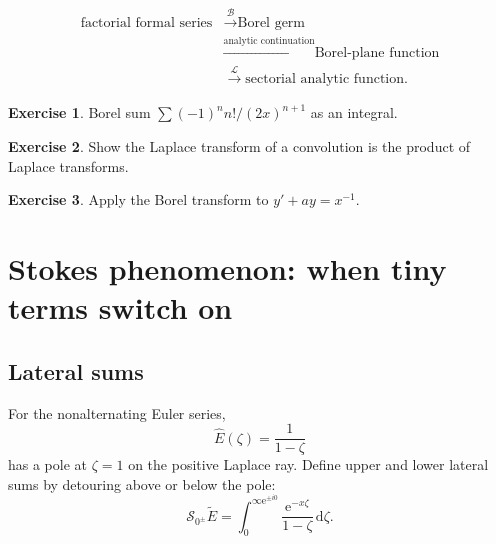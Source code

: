 \documentclass[11pt,oneside,openany]{book}
\newcommand{\e}{\mathrm{e}}
\newcommand{\dd}{\,\mathrm{d}}
\newcommand{\Borel}{\mathcal{B}}
\newcommand{\Laplace}{\mathcal{L}}
\theoremstyle{plain}
\theoremstyle{definition}
\newtheorem{exercise}{Exercise}[chapter]
\theoremstyle{remark}
\begin{document}
\begin{checkpoint}
\[
\begin{aligned}
  \text{factorial formal series}
  &\xrightarrow{\Borel}\text{Borel germ}\\
  &\xrightarrow{\text{analytic continuation}}\text{Borel-plane function}\\
  &\xrightarrow{\Laplace}\text{sectorial analytic function}.
\end{aligned}
\]
\end{checkpoint}

\begin{exercise}
Borel sum $\sum(-1)^nn!/(2x)^{n+1}$ as an integral.
\end{exercise}

\begin{exercise}
Show the Laplace transform of a convolution is the product of Laplace transforms.
\end{exercise}

\begin{exercise}
Apply the Borel transform to $y'+ay=x^{-1}$.
\end{exercise}


\chapter{Stokes phenomenon: when tiny terms switch on}
\label{ch:stokes}

\section{Lateral sums}
For the nonalternating Euler series,
\[
  \widehat E(\zeta)=\frac1{1-\zeta}
\]
has a pole at $\zeta=1$ on the positive Laplace ray. Define upper and lower lateral sums by detouring above or below the pole:
\[
  \mathcal S_{0^\pm}\widetilde E
  =\int_0^{\infty\e^{\pm i0}}
  \frac{\e^{-x\zeta}}{1-\zeta}\dd\zeta.
\]

\begin{center}
\end{center}
\end{document}
